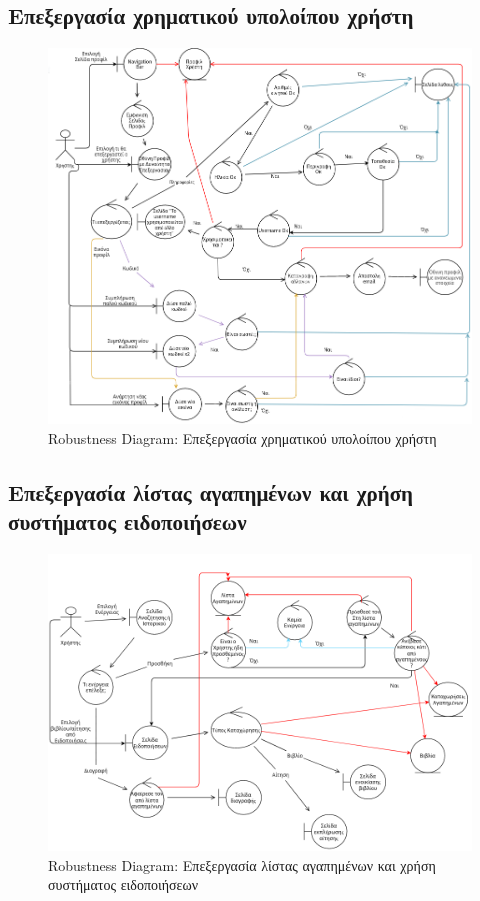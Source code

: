 \documentclass[12pt,a4paper]{article}
\begin{document}
\subsection{Επεξεργασία χρηματικού υπολοίπου χρήστη}
\begin{figure}[H]
	\includegraphics[width=\textwidth]{View and Edit User Account Details Robustness.png}
	\caption{Robustness Diagram: Επεξεργασία χρηματικού υπολοίπου χρήστη}
	\label{Robustness Diagram: Επεξεργασία χρηματικού υπολοίπου χρήστη}
\end{figure}

\subsection{Επεξεργασία λίστας αγαπημένων και χρήση συστήματος ειδοποιήσεων}
\begin{figure}[H]
	\includegraphics[width=\textwidth]{Favorite Users and Notification System Robustness.png}
	\caption{Robustness Diagram: Επεξεργασία λίστας αγαπημένων και χρήση συστήματος ειδοποιήσεων}
	\label{Robustness Diagram: Επεξεργασία λίστας αγαπημένων και χρήση συστήματος ειδοποιήσεων}
\end{figure}
\end{document}
